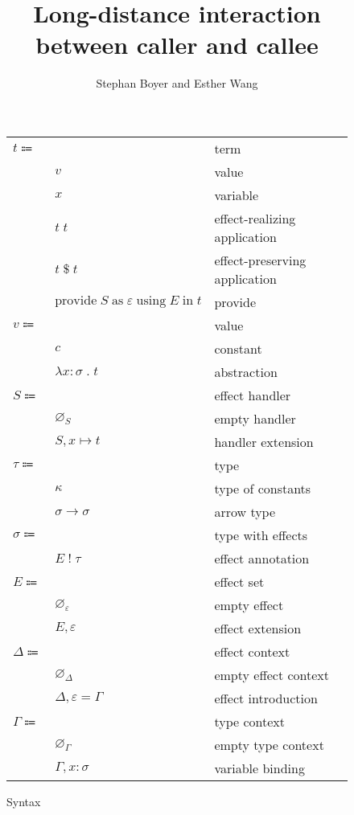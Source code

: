 \documentclass[12pt]{article}
\title{Long-distance interaction \\ between caller and callee}
\author{Stephan Boyer and Esther Wang}
\date{}
\newcommand\eterm{t}
\newcommand\evalue{v}
\newcommand\econst{c}
\newcommand\evar{x}
\newcommand\eabs[2]{\lambda #1 \; . \; #2} %
\newcommand\eapp[2]{#1 \; #2}
\newcommand\eappx[2]{#1 \; \$ \; #2}
\newcommand\eprovide[4]{\text{provide} \; #1 \; \text{as} \; #2 \; \text{using} \; #3 \; \text{in} \; #4}
\newcommand\pall{S}
\newcommand\pitem[2]{#1 \mapsto #2} %
\newcommand\pempty{\varnothing_{\pall}}
\newcommand\pextend[2]{#1, #2}
\newcommand\ttype{\tau}
\newcommand\tconst{\kappa}
\newcommand\tarrow[2]{#1 \rightarrow #2} %
\newcommand\tanno[2]{#1 : #2} %
\newcommand\tx{\sigma}
\newcommand\twithx[2]{#1 \; ! \; #2} %
\newcommand\xeffect{\varepsilon}
\newcommand\xeffects{E}
\newcommand\xempty{\varnothing_{\xeffect}}
\newcommand\xextend[2]{#1, #2}
\newcommand\xc{\Delta}
\newcommand\xcempty{\varnothing_{\xc}}
\newcommand\xcextend[2]{#1, #2}
\newcommand\xcitem[2]{#1 = #2}
\newcommand\ccontext{\Gamma}
\newcommand\cempty{\varnothing_{\ccontext}}
\newcommand\cextend[2]{#1, #2}
\begin{document}
  \maketitle

  \begin{figure}
    \begin{mdframed}
      \begin{center}
        \begin{tabular}{l l l}
          $\eterm \Coloneqq $ & & term \\
          & $\evalue$ & value \\
          & $\evar$ & variable \\
          & $\eapp{\eterm}{\eterm}$ & effect-realizing application \\
          & $\eappx{\eterm}{\eterm}$ & effect-preserving application \\
          & $\eprovide{\pall}{\xeffect}{\xeffects}{\eterm}$ & provide \\
          $\evalue \Coloneqq $ & & value \\
          & $\econst$ & constant \\
          & $\eabs{\tanno{\evar}{\tx}}{\eterm}$ & abstraction \\
          $\pall \Coloneqq$ & & effect handler \\
          & $\pempty$ & empty handler \\
          & $\pextend{\pall}{\pitem{\evar}{\eterm}}$ & handler extension \\
          $\ttype \Coloneqq$ & & type \\
          & $\tconst$ & type of constants \\
          & $\tarrow{\tx}{\tx}$ & arrow type \\
          $\tx \Coloneqq$ & & type with effects \\
          & $\twithx{\xeffects}{\ttype}$ & effect annotation \\
          $\xeffects \Coloneqq$ & & effect set \\
          & $\xempty$ & empty effect \\
          & $\xextend{\xeffects}{\xeffect}$ & effect extension \\
          $\xc \Coloneqq$ & & effect context \\
          & $\xcempty$ & empty effect context \\
          & $\xcextend{\xc}{\xcitem{\xeffect}{\ccontext}}$ & effect introduction \\
          $\ccontext \Coloneqq$ & & type context \\
          & $\cempty$ & empty type context \\
          & $\cextend{\ccontext}{\tanno{\evar}{\tx}}$ & variable binding \\
        \end{tabular}
      \end{center}

      \caption{Syntax}\label{fig:syntax}
    \end{mdframed}
  \end{figure}
\end{document}
